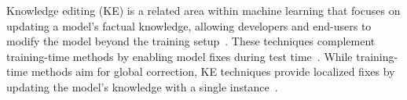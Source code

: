 Knowledge editing (KE) is a related area within machine learning that focuses on updating a model's factual knowledge, allowing developers and end-users to modify the model beyond the training setup~\cite{mitchell2021fast,meng2022locating,wang2024detoxifying}. These techniques complement training-time methods by enabling model fixes during test time~\cite{mitchell2021fast}. While training-time methods aim for global correction, KE techniques provide localized fixes by updating the model's knowledge with a single instance~\cite{mitchell2021fast,meng2022locating,wang2024detoxifying}.









